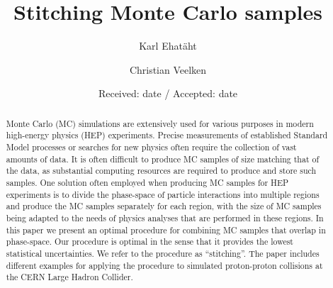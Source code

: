 \documentclass[twocolumn,epjc3]{svjour3}
\begin{document}
\title{Stitching Monte Carlo samples%
}


\author{Karl Ehat\"aht
        \and
        Christian Veelken %
}





\date{Received: date / Accepted: date}

\maketitle

\linenumbers

\begin{abstract}
Monte Carlo (MC) simulations are extensively used for various purposes in modern high-energy physics (HEP) experiments.
Precise measurements of established Standard Model processes or searches for new physics often require the collection of vast amounts of data.
It is often difficult to produce MC samples of size matching that of the data, as substantial computing resources are required to produce and store such samples.
One solution often employed when producing MC samples for HEP experiments 
is to divide the phase-space of particle interactions into multiple regions 
and produce the MC samples separately for each region,
with the size of MC samples being adapted to the needs of physics analyses that are performed in these regions.
In this paper we present an optimal procedure for combining MC samples that overlap in phase-space.
Our procedure is optimal in the sense that it provides the lowest statistical uncertainties.
We refer to the procedure as ``stitching''.
The paper includes different examples for applying the procedure to simulated proton-proton collisions at the CERN Large Hadron Collider.
\end{abstract}
\end{document}
